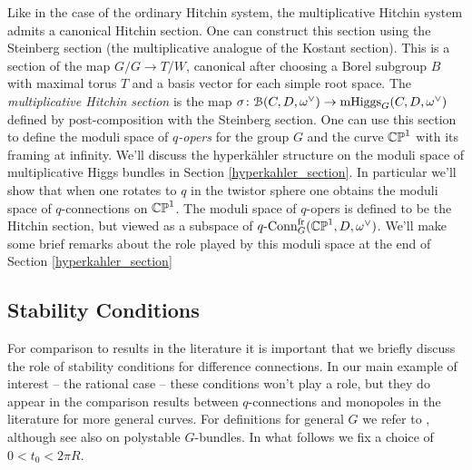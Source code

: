 \documentclass[10pt, oneside]{article}
\DeclareMathOperator{\mhiggs}{mHiggs}
\newcommand{\qconn}{q\text{-Conn}}
\newcommand{\fr}{\mathrm{fr}}
\begin{document}
\begin{remark}
Like in the case of the ordinary Hitchin system, the multiplicative Hitchin system admits a canonical Hitchin section.  One can construct this section using the Steinberg section (the multiplicative analogue of the Kostant section).  This is a section of the map $G/G \to T/W$, canonical after choosing a Borel subgroup $B$ with maximal torus $T$ and a basis vector for each simple root space.  The \emph{multiplicative Hitchin section} is the map $\sigma \colon \mc B(C,D,\omega^\vee) \to \mhiggs_G(C,D,\omega^\vee)$ defined by post-composition with the Steinberg section.  One can use this section to define the moduli space of \emph{$q$-opers} for the group $G$ and the curve $\mathbb{CP}^1$ with its framing at infinity.  We'll discuss the hyperk\"ahler structure on the moduli space of multiplicative Higgs bundles in Section \ref{hyperkahler_section}.  In particular we'll show that when one rotates to $q$ in the twistor sphere one obtains the moduli space of $q$-connections on $\mathbb{CP}^1$.  The moduli space of $q$-opers is defined to be the Hitchin section, but viewed as a subspace of $\qconn^{\fr}_G(\bb{CP}^1,D,\omega^\vee)$.  We'll make some brief remarks about the role played by this moduli space at the end of Section \ref{hyperkahler_section}
\end{remark}

\subsection{Stability Conditions}
For comparison to results in the literature it is important that we briefly discuss the role of stability conditions for difference connections.  In our main example of interest -- the rational case -- these conditions won't play a role, but they do appear in the comparison results between $q$-connections and monopoles in the literature for more general curves.  For definitions for general $G$ we refer to \cite{Smith}, although see also \cite{AnchoucheBiswas} on polystable $G$-bundles.  In what follows we fix a choice of $0 < t_0 < 2\pi R$.
\end{document}
